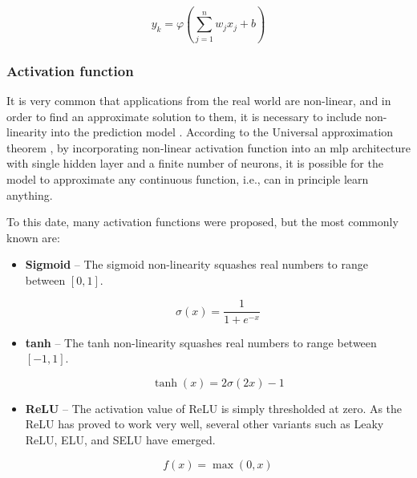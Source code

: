             \begin{equation}
                y_k = \varphi \left(\sum\limits_{j=1}^n w_j x_j + b \right)
            \end{equation}
        
        \subsubsection{Activation function}
            It is very common that applications from the real world are non-linear, and in order to find an approximate solution to them, it is necessary to include non-linearity into the prediction model \cite{goodfellow2016deep}. According to the Universal approximation theorem \cite{hornik1989multilayer}, by incorporating non-linear activation function into an \gls{mlp} architecture with single hidden layer and a finite number of neurons, it is possible for the model to approximate any continuous function, i.e., can in principle learn anything. 
            
            To this date, many activation functions were proposed, but the most commonly known \cite{cs231n} are:
            
           \begin{itemize}
                \item \textbf{Sigmoid} -- The sigmoid non-linearity squashes real numbers to range between $[0,1]$.
                
                \begin{equation}
                   \sigma(x) = \frac{1}{1 + e^{-x}}
                \end{equation}
                
                \item \textbf{tanh} -- The tanh non-linearity squashes real numbers to range between $[-1,1]$.
                
                \begin{equation}
                    \tanh(x) =  2\sigma(2x) - 1
                \end{equation}
                
                \item \textbf{ReLU} -- The activation value of ReLU is simply thresholded at zero. As the ReLU has proved to work very well, several other variants such as Leaky ReLU, ELU, and SELU have emerged.
                
                \begin{equation}
                    f(x) = \max(0, x)
                \end{equation}
            \end{itemize}
    
